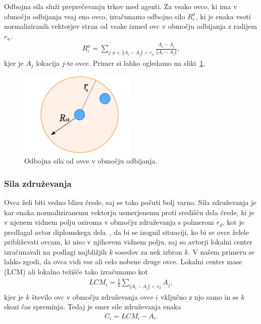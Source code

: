 Odbojna sila služi preprečevanju trkov med agenti. Za vsako ovco, ki ima v območju odbijanja vsaj eno ovco, izračunamo odbojno silo $R_i^a$, ki je enaka vsoti normaliziranih vektorjev stran od vsake izmed ovc v območju odbijanja z radijem $r_a$.
\begin{align}
R_i^a = \sum_{j\not=i,~\Vert A_i - A_j\Vert < r_a}\frac{ A_i - A_j}{\Vert A_i - A_j\Vert}, \label{eq:stroembom-odboj}
\end{align}
kjer je $A_j$ lokacija $j$-te ovce. Primer si lahko ogledamo na sliki~\ref{fig:stroembom-odboj}.

\begin{figure}[ht]  %
	\centering
	\includegraphics[width=0.49\textwidth]{../poglavja/images/stroembom_odboj.pdf}
	\caption[Odbojna sila]{Odbojna sila od ovce v območju odbijanja.} %
	\label{fig:stroembom-odboj}
\end{figure}

\subsubsection{Sila združevanja}

Ovca želi biti vedno blizu črede, saj se tako počuti bolj varno. Sila združevanja je kar enaka normaliziranemu vektorju usmerjenemu proti središču dela črede, ki je v njenem vidnem polju oziroma v območju združevanja s polmerom $r_d$, kot je predlagal avtor diplomskega dela~\cite{diplomska}, da bi se izognil situaciji, ko bi se ovce želele približevati ovcam, ki niso v njihovem vidnem polju, saj so avtorji lokalni center izračunavali na podlagi najbližjih $k$ sosedov za nek izbran $k$. V našem primeru se lahko zgodi, da ovca vidi vse ali celo nobene druge ovce. Lokalni center mase (LCM) ali lokalno težišče tako izračunamo kot
\begin{align}
LCM_i = \frac{1}{k}\sum_{\Vert A_i - A_j\Vert < r_d} A_j, \label{eq:stroembom-lcm}
\end{align}
kjer je $k$ število ovc v območju združevanja ovce $i$ vključno z njo samo in se $k$ skozi čas spreminja. Tedaj je smer sile združevanja enaka
\begin{align}
C_i = LCM_i - A_i. \label{eq:stroembom-zdruzi}
\end{align}

